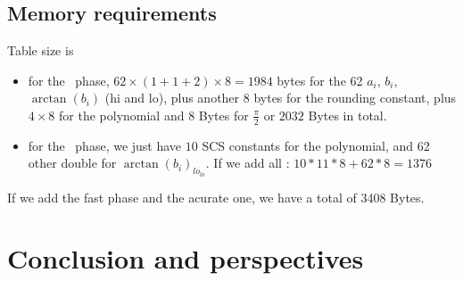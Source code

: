 \subsection{Memory requirements}
Table size is
\begin{itemize}
\item for the \quick\ phase,
  $62\times (1+1+2) \times8=1984$ bytes for the 62 $a_i$, $b_i$,
  $\arctan(b_i)$ (hi and lo), plus another $8$ bytes for the rounding
  constant, plus $4\times8$ for the polynomial and $8$ Bytes for
  $\frac{\pi}{2}$ or $2032$ Bytes in total.
  
\item for the \accurate\ phase, we just have $10$ SCS constants for the
  polynomial, and 62 other double for $\arctan(b_i)_{lo_{lo}}$.
  If we add all : $10*11*8 + 62*8 = 1376$
\end{itemize}
If we add the fast phase and the acurate one, we have a total of 3408
Bytes.
\section{Conclusion and perspectives}

